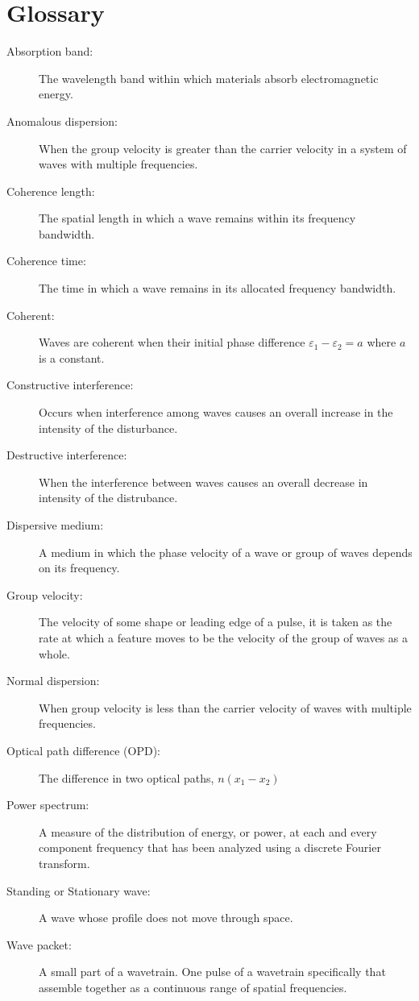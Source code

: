 \documentclass[12pt]{report}
\begin{document}
\section{Glossary}
\begin{description}
\item[Absorption band:] The wavelength band within which materials absorb electromagnetic energy.
\item[Anomalous dispersion:] When the group velocity is greater than the carrier velocity in a system of waves with multiple frequencies. 
\item[Coherence length:] The spatial length in which a wave remains within its frequency bandwidth. 
\item[Coherence time:] The time in which a wave remains in its allocated frequency bandwidth. 
\item[Coherent:] Waves are coherent when their initial phase difference $\varepsilon_1-\varepsilon_2 = a$ where $a$ is a constant.
\item[Constructive interference:] Occurs when interference among waves causes an overall increase in the intensity of the disturbance. 
\item[Destructive interference:] When the interference between waves causes an overall decrease in intensity of the distrubance. 
\item[Dispersive medium:] A medium in which the phase velocity of a wave or group of waves depends on its frequency. 
\item[Group velocity:] The velocity of some shape or leading edge of a pulse, it is taken as the rate at which a feature moves to be the velocity of the group of waves as a whole. 
\item[Normal dispersion:] When group velocity is less than the carrier velocity of waves with multiple frequencies. 
\item[Optical path difference (OPD):] The difference in two optical paths, $n(x_1-x_2)$
\item[Power spectrum:]  A measure of the distribution of energy, or power, at each and every component frequency that has been analyzed using a discrete Fourier transform.
\item[Standing or Stationary wave:] A wave whose profile does not move through space.
\item[Wave packet:] A small part of a wavetrain. One pulse of a wavetrain specifically that assemble together as a continuous range of spatial frequencies. 
\end{description}
\end{document}
